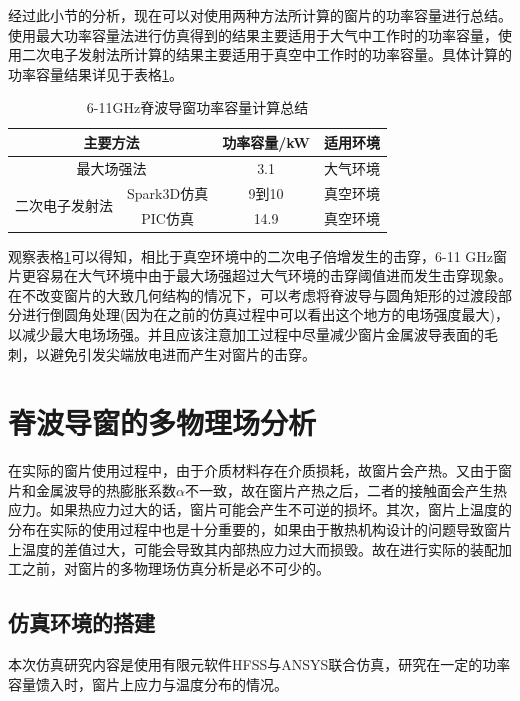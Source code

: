 \documentclass[master]{thesis-uestc}
\begin{document}
经过此小节的分析，现在可以对使用两种方法所计算的窗片的功率容量进行总结。使用最大功率容量法进行仿真得到的结果主要适用于大气中工作时的功率容量，使用二次电子发射法所计算的结果主要适用于真空中工作时的功率容量。具体计算的功率容量结果详见于表格\ref{tab:X频段脊波导窗功率容量}。

\begin{table}[!htb]
    \centering
    \caption{6-11GHz脊波导窗功率容量计算总结}
    \label{tab:X频段脊波导窗功率容量}
    \begin{tabular}{@{}cccc@{}}
    \toprule[1.5pt]
    \multicolumn{2}{c}{主要方法}             & 功率容量/kW & 适用环境 \\ \midrule
    \multicolumn{2}{c}{最大场强法}            & 3.1     & 大气环境 \\
    \multirow{2}{*}{二次电子发射法} & Spark3D仿真 & 9到10    & 真空环境 \\
                             & PIC仿真     & 14.9    & 真空环境 \\ \bottomrule[1.5pt]
    \end{tabular}
\end{table}

观察表格\ref{tab:X频段脊波导窗功率容量}可以得知，相比于真空环境中的二次电子倍增发生的击穿，6-11 GHz窗片更容易在大气环境中由于最大场强超过大气环境的击穿阈值进而发生击穿现象。
在不改变窗片的大致几何结构的情况下，可以考虑将脊波导与圆角矩形的过渡段部分进行倒圆角处理(因为在之前的仿真过程中可以看出这个地方的电场强度最大)，以减少最大电场场强。并且应该注意加工过程中尽量减少窗片金属波导表面的毛刺，以避免引发尖端放电进而产生对窗片的击穿。

\section{脊波导窗的多物理场分析}
在实际的窗片使用过程中，由于介质材料存在介质损耗，故窗片会产热。又由于窗片和金属波导的热膨胀系数\(\alpha\)不一致，故在窗片产热之后，二者的接触面会产生热应力。如果热应力过大的话，窗片可能会产生不可逆的损坏。其次，窗片上温度的分布在实际的使用过程中也是十分重要的，如果由于散热机构设计的问题导致窗片上温度的差值过大，可能会导致其内部热应力过大而损毁。故在进行实际的装配加工之前，对窗片的多物理场仿真分析是必不可少的。
\subsection{仿真环境的搭建}
本次仿真研究内容是使用有限元软件HFSS与ANSYS联合仿真，研究在一定的功率容量馈入时，窗片上应力与温度分布的情况。
\end{document}
